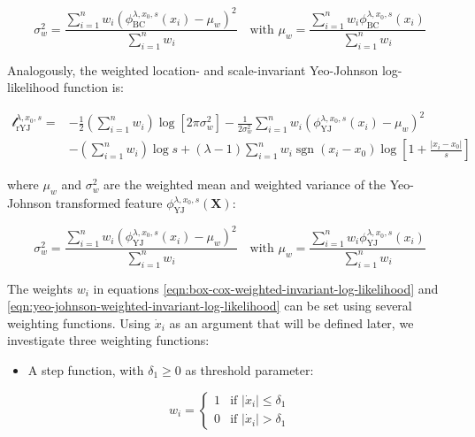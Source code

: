 \documentclass[
  a4paper,
]{article}
\providecommand{\tightlist}{%
  \setlength{\itemsep}{0pt}\setlength{\parskip}{0pt}}
\DeclareMathOperator{\sgn}{sgn}
\begin{document}
\begin{equation}
\sigma_w^2 = \frac{\sum_{i=1}^n w_i \left(\phi_{\text{BC}}^{\lambda, x_0, s} (x_i) - \mu_w \right)^2}{\sum_{i=1}^n w_i} \quad \text{with } \mu_w = \frac{\sum_{i=1}^n w_i \phi_{\text{BC}}^{\lambda, x_0, s} (x_i)} {\sum_{i=1}^n w_i}
\end{equation}

Analogously, the weighted location- and scale-invariant Yeo-Johnson
log-likelihood function is:

\begin{equation}
\label{eqn:yeo-johnson-weighted-invariant-log-likelihood}
\begin{split}
\mathcal{l}_{\text{rYJ}}^{\lambda, x_0, s} = & -\frac{1}{2} \left(\sum_{i=1}^n w_i \right) \log \left[ 2 \pi \sigma_w^2 \right] -\frac{1}{2 \sigma_w^2} \sum_{i=1}^n w_i \left( \phi_{\text{YJ}}^{\lambda, x_0, s}(x_i) - \mu_w \right)^2 \\
& - \left( \sum_{i=1}^n w_i \right) \log s + (\lambda - 1) \sum_{i=1}^n w_i \sgn(x_i - x_0) \log \left[1 + \frac{|x_i - x_0|}{s} \right]
\end{split}
\end{equation}

where \(\mu_w\) and \(\sigma^2_w\) are the weighted mean and weighted
variance of the Yeo-Johnson transformed feature
\(\phi_{\text{YJ}}^{\lambda, x_0, s} (\mathbf{X})\):

\begin{equation}
\sigma_w^2 = \frac{\sum_{i=1}^n w_i \left(\phi_{\text{YJ}}^{\lambda, x_0, s} (x_i) - \mu_w \right)^2}{\sum_{i=1}^n w_i} \quad \text{with } \mu_w = \frac{\sum_{i=1}^n w_i \phi_{\text{YJ}}^{\lambda, x_0, s} (x_i)} {\sum_{i=1}^n w_i}
\end{equation}

The weights \(w_i\) in equations
\ref{eqn:box-cox-weighted-invariant-log-likelihood} and
\ref{eqn:yeo-johnson-weighted-invariant-log-likelihood} can be set using
several weighting functions. Using \(\dot{x}_i\) as an argument that
will be defined later, we investigate three weighting functions:

\begin{itemize}
\tightlist
\item
  A step function, with \(\delta_1 \geq 0\) as threshold parameter:
\end{itemize}

\begin{equation}
w_i =
\begin{cases}
1 & \text{if } \left| \dot{x}_i \right| \leq \delta_1\\
0 & \text{if } \left| \dot{x}_i \right| > \delta_1
\end{cases}
\end{equation}
\end{document}
